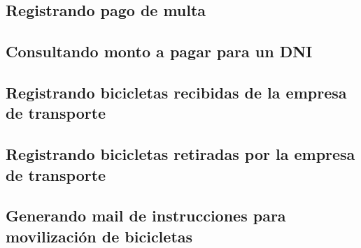 \documentclass[a4paper, 10pt, twoside]{article}
\begin{document}
\subsection{Registrando pago de multa}
\begin{usecase}
  \ucpre{}
  \ucpost{}
  \ucname{}
  \ucactor{}
\end{usecase}
\begin{usecasesteps}
  \ucstep{}{}
  \ucstep{}{}
  \ucstep{}{}
\end{usecasesteps}

\subsection{Consultando monto a pagar para un DNI}
\begin{usecase}
  \ucpre{}
  \ucpost{}
  \ucname{}
  \ucactor{}
\end{usecase}
\begin{usecasesteps}
  \ucstep{}{}
  \ucstep{}{}
  \ucstep{}{}
\end{usecasesteps}

\subsection{Registrando bicicletas recibidas de la empresa de transporte}
\begin{usecase}
  \ucpre{}
  \ucpost{}
  \ucname{}
  \ucactor{}
\end{usecase}
\begin{usecasesteps}
  \ucstep{}{}
  \ucstep{}{}
  \ucstep{}{}
\end{usecasesteps}

\subsection{Registrando bicicletas retiradas por la empresa de transporte}
\begin{usecase}
  \ucpre{}
  \ucpost{}
  \ucname{}
  \ucactor{}
\end{usecase}
\begin{usecasesteps}
  \ucstep{}{}
  \ucstep{}{}
  \ucstep{}{}
\end{usecasesteps}

\subsection{Generando mail de instrucciones para movilización de bicicletas}
\begin{usecase}
  \ucpre{}
  \ucpost{}
  \ucname{}
  \ucactor{}
\end{usecase}
\begin{usecasesteps}
  \ucstep{}{}
  \ucstep{}{}
  \ucstep{}{}
\end{usecasesteps}
\end{document}
